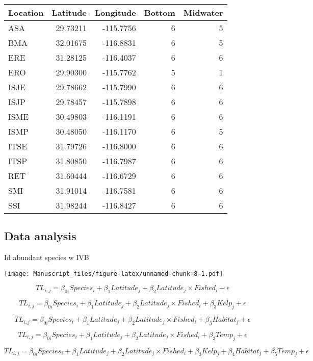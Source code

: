 \documentclass[12pt,]{article}
\begin{document}
\begin{table}[!h]
\centering
\begin{tabular}{lrrrr}
\toprule
Location & Latitude & Longitude & Bottom & Midwater\\
\midrule
ASA & 29.73211 & -115.7756 & 6 & 5\\
BMA & 32.01675 & -116.8831 & 6 & 5\\
ERE & 31.28125 & -116.4037 & 6 & 6\\
ERO & 29.90300 & -115.7762 & 5 & 1\\
ISJE & 29.78662 & -115.7990 & 6 & 6\\
\addlinespace
ISJP & 29.78457 & -115.7898 & 6 & 6\\
ISME & 30.49803 & -116.1191 & 6 & 6\\
ISMP & 30.48050 & -116.1170 & 6 & 5\\
ITSE & 31.79726 & -116.8000 & 6 & 6\\
ITSP & 31.80850 & -116.7987 & 6 & 6\\
\addlinespace
RET & 31.60444 & -116.6729 & 6 & 6\\
SMI & 31.91014 & -116.7581 & 6 & 6\\
SSI & 31.98244 & -116.8427 & 6 & 6\\
\bottomrule
\end{tabular}
\end{table}

\subsection{Data analysis}\label{data-analysis}

Id abundant species w IVB

\texttt{[image: Manuscript\_files/figure-latex/unnamed-chunk-8-1.pdf]}

\[TL_{i,j} = \beta_{0i}Species_i + \beta_1 Latitude_j + \beta_2 Latitude_j \times Fished_i + \epsilon\]

\[TL_{i,j} = \beta_{0i}Species_i + \beta_1 Latitude_j + \beta_2 Latitude_j \times Fished_i + \beta_3Kelp_j + \epsilon\]

\[TL_{i,j} = \beta_{0i}Species_i + \beta_1 Latitude_j + \beta_2 Latitude_j \times Fished_i + \beta_3Habitat_j + \epsilon\]

\[TL_{i,j} = \beta_{0i}Species_i + \beta_1 Latitude_j + \beta_2 Latitude_j \times Fished_i + \beta_3Temp_j + \epsilon\]

\[TL_{i,j} = \beta_{0i}Species_i + \beta_1 Latitude_j + \beta_2 Latitude_j \times Fished_i + \beta_3Kelp_j + \beta_4Habitat_j + \beta_5Temp_j + \epsilon\]
\end{document}
